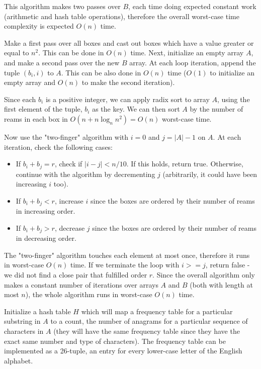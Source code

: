 \documentclass[12pt,twoside]{article}
\begin{document}
\begin{problems}
\begin{problemparts}
This algorithm makes two passes over $B$, each time doing expected constant work (arithmetic and hash table operations), therefore the overall worst-case time complexity is expected $O(n)$ time.

\problempart %
Make a first pass over all boxes and cast out boxes which have a value greater or equal to $n^2$. This can be done in $O(n)$ time. Next, initialize an empty array $A$, and make a second pass over the new $B$ array. At each loop iteration, append the tuple $(b_i, i)$ to $A$. This can be also done in $O(n)$ time ($O(1)$ to initialize an empty array and $O(n)$ to make the second iteration).

Since each $b_i$ is a positive integer, we can apply radix sort to array $A$, using the first element of the tuple, $b_i$ as the key. We can then sort $A$ by the number of reams in each box in $O(n+n \log_n n^2)=O(n)$ worst-case time.

Now use the "two-finger" algorithm with $i=0$ and $j=|A|-1$ on $A$. At each iteration, check the following cases:
\begin{itemize}
    \item If $b_i+b_j=r$, check if $|i-j|<n/10$. If this holds, return true. Otherwise, continue with the algorithm by decrementing $j$ (arbitrarily, it could have been increasing $i$ too).
    \item If $b_i+b_j<r$, increase $i$ since the boxes are ordered by their number of reams in increasing order.
    \item If $b_i+b_j>r$, decrease $j$ since the boxes are ordered by their number of reams in decreasing order.
\end{itemize}

The "two-finger" algorithm touches each element at most once, therefore it runs in worst-case $O(n)$ time. If we terminate the loop with $i>=j$, return false - we did not find a close pair that fulfilled order $r$. Since the overall algorithm only makes a constant number of iterations over arrays $A$ and $B$ (both with length at most $n$), the whole algorithm runs in worst-case $O(n)$ time.

\end{problemparts}

\newpage

\problem  %

\begin{problemparts}
\problempart %
Initialize a hash table $H$ which will map a frequency table for a particular substring in $A$ to a count, the number of anagrams for a particular sequence of characters in $A$ (they will have the same frequency table since they have the exact same number and type of characters). The frequency table can be implemented as a 26-tuple, an entry for every lower-case letter of the English alphabet.


\end{problemparts}
\end{problems}
\end{document}
